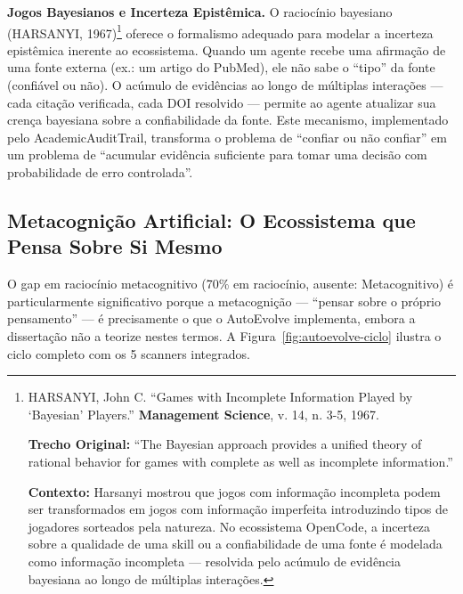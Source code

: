 \textbf{Jogos Bayesianos e Incerteza Epistêmica.} O raciocínio bayesiano (HARSANYI, 1967)\footnote{
  HARSANYI, John C. ``Games with Incomplete Information Played by `Bayesian' Players.'' \textbf{Management Science}, v. 14, n. 3-5, 1967.

  \textbf{Trecho Original:} ``The Bayesian approach provides a unified theory of rational behavior for games with complete as well as incomplete information.''

  \textbf{Contexto:} Harsanyi mostrou que jogos com informação incompleta podem ser transformados em jogos com informação imperfeita introduzindo tipos de jogadores sorteados pela natureza. No ecossistema OpenCode, a incerteza sobre a qualidade de uma skill ou a confiabilidade de uma fonte é modelada como informação incompleta --- resolvida pelo acúmulo de evidência bayesiana ao longo de múltiplas interações.
} oferece o formalismo adequado para modelar a incerteza epistêmica inerente ao ecossistema. Quando um agente recebe uma afirmação de uma fonte externa (ex.: um artigo do PubMed), ele não sabe o ``tipo'' da fonte (confiável ou não). O acúmulo de evidências ao longo de múltiplas interações --- cada citação verificada, cada DOI resolvido --- permite ao agente atualizar sua crença bayesiana sobre a confiabilidade da fonte. Este mecanismo, implementado pelo AcademicAuditTrail, transforma o problema de ``confiar ou não confiar'' em um problema de ``acumular evidência suficiente para tomar uma decisão com probabilidade de erro controlada''.

\subsection{Metacognição Artificial: O Ecossistema que Pensa Sobre Si Mesmo}

O gap em raciocínio metacognitivo (70\% em raciocínio, ausente: Metacognitivo) é particularmente significativo porque a metacognição --- ``pensar sobre o próprio pensamento'' --- é precisamente o que o AutoEvolve implementa, embora a dissertação não a teorize nestes termos. A Figura~\ref{fig:autoevolve-ciclo} ilustra o ciclo completo com os 5 scanners integrados.

